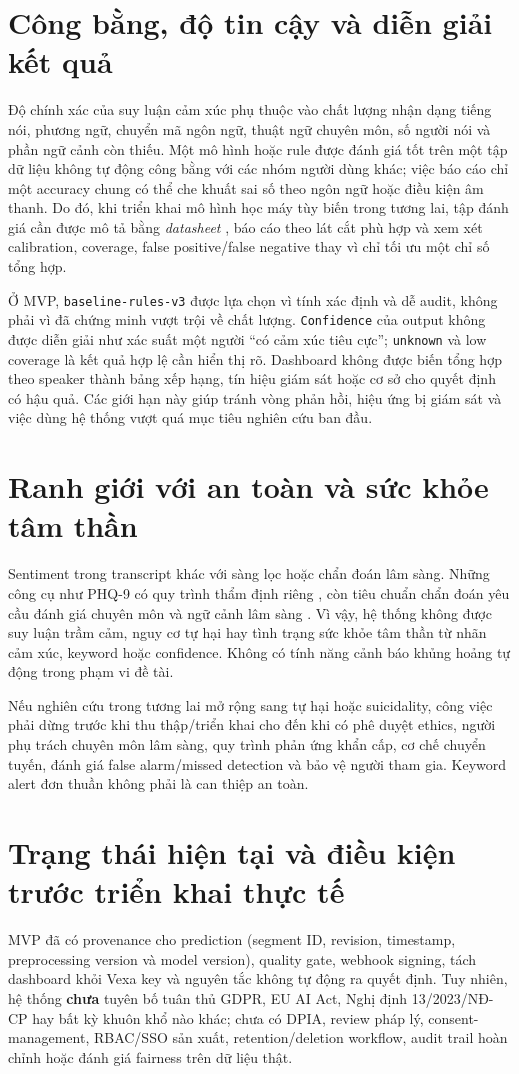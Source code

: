 \section{Công bằng, độ tin cậy và diễn giải kết quả}
Độ chính xác của suy luận cảm xúc phụ thuộc vào chất lượng nhận dạng tiếng nói, phương ngữ, chuyển mã ngôn ngữ, thuật ngữ chuyên môn, số người nói và phần ngữ cảnh còn thiếu. Một mô hình hoặc rule được đánh giá tốt trên một tập dữ liệu không tự động công bằng với các nhóm người dùng khác; việc báo cáo chỉ một accuracy chung có thể che khuất sai số theo ngôn ngữ hoặc điều kiện âm thanh. Do đó, khi triển khai mô hình học máy tùy biến trong tương lai, tập đánh giá cần được mô tả bằng \emph{datasheet} \cite{gebru2021}, báo cáo theo lát cắt phù hợp và xem xét calibration, coverage, false positive/false negative thay vì chỉ tối ưu một chỉ số tổng hợp.

Ở MVP, \texttt{baseline-rules-v3} được lựa chọn vì tính xác định và dễ audit, không phải vì đã chứng minh vượt trội về chất lượng. \texttt{Confidence} của output không được diễn giải như xác suất một người ``có cảm xúc tiêu cực''; \texttt{unknown} và low coverage là kết quả hợp lệ cần hiển thị rõ. Dashboard không được biến tổng hợp theo speaker thành bảng xếp hạng, tín hiệu giám sát hoặc cơ sở cho quyết định có hậu quả. Các giới hạn này giúp tránh vòng phản hồi, hiệu ứng bị giám sát và việc dùng hệ thống vượt quá mục tiêu nghiên cứu ban đầu.

\section{Ranh giới với an toàn và sức khỏe tâm thần}
Sentiment trong transcript khác với sàng lọc hoặc chẩn đoán lâm sàng. Những công cụ như PHQ-9 có quy trình thẩm định riêng \cite{kroenke2001}, còn tiêu chuẩn chẩn đoán yêu cầu đánh giá chuyên môn và ngữ cảnh lâm sàng \cite{dsm5}. Vì vậy, hệ thống không được suy luận trầm cảm, nguy cơ tự hại hay tình trạng sức khỏe tâm thần từ nhãn cảm xúc, keyword hoặc confidence. Không có tính năng cảnh báo khủng hoảng tự động trong phạm vi đề tài.

Nếu nghiên cứu trong tương lai mở rộng sang tự hại hoặc suicidality, công việc phải dừng trước khi thu thập/triển khai cho đến khi có phê duyệt ethics, người phụ trách chuyên môn lâm sàng, quy trình phản ứng khẩn cấp, cơ chế chuyển tuyến, đánh giá false alarm/missed detection và bảo vệ người tham gia. Keyword alert đơn thuần không phải là can thiệp an toàn.

\section{Trạng thái hiện tại và điều kiện trước triển khai thực tế}
MVP đã có provenance cho prediction (segment ID, revision, timestamp, preprocessing version và model version), quality gate, webhook signing, tách dashboard khỏi Vexa key và nguyên tắc không tự động ra quyết định. Tuy nhiên, hệ thống \textbf{chưa} tuyên bố tuân thủ GDPR, EU AI Act, Nghị định 13/2023/NĐ-CP hay bất kỳ khuôn khổ nào khác; chưa có DPIA, review pháp lý, consent-management, RBAC/SSO sản xuất, retention/deletion workflow, audit trail hoàn chỉnh hoặc đánh giá fairness trên dữ liệu thật.

